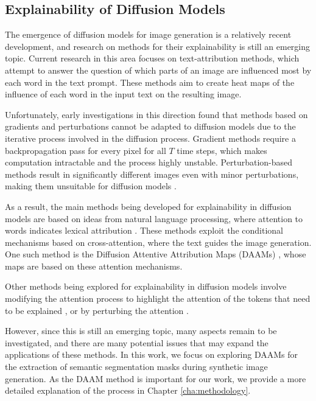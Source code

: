 \subsection{Explainability of Diffusion Models}
\label{sec:explainability-dm}

The emergence of diffusion models for image generation is a relatively recent development, and research on methods for their explainability is still an emerging topic. Current research in this area focuses on text-attribution methods, which attempt to answer the question of which parts of an image are influenced most by each word in the text prompt. These methods aim to create heat maps of the influence of each word in the input text on the resulting image.

Unfortunately, early investigations in this direction found that methods based on gradients and perturbations cannot be adapted to diffusion models due to the iterative process involved in the diffusion process. Gradient methods require a backpropagation pass for every pixel for all $T$ time steps, which makes computation intractable and the process highly unstable. Perturbation-based methods result in significantly different images even with minor perturbations, making them unsuitable for diffusion models \cite{DAAM}.

As a result, the main methods being developed for explainability in diffusion models are based on ideas from natural language processing, where attention to words indicates lexical attribution \cite{clark-etal-2019-bert}. These methods exploit the conditional mechanisms based on cross-attention, where the text guides the image generation. One such method is the Diffusion Attentive Attribution Maps (DAAMs) \cite{DAAM}, whose maps are based on these attention mechanisms.

Other methods being explored for explainability in diffusion models involve modifying the attention process to highlight the attention of the tokens that need to be explained \cite{AttendAndExcite}, or by perturbing the attention \cite{deb2023atman}.

However, since this is still an emerging topic, many aspects remain to be investigated, and there are many potential issues that may expand the applications of these methods. In this work, we focus on exploring DAAMs for the extraction of semantic segmentation masks during synthetic image generation. As the DAAM method is important for our work, we provide a more detailed explanation of the process in Chapter \ref{cha:methodology}.




